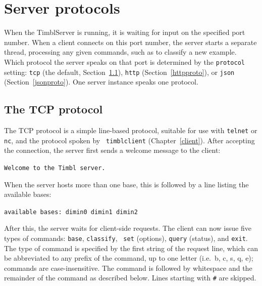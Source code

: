 \documentclass{report}
\begin{document}
\chapter{Server protocols}
\label{serverformat}

When the TimblServer is running, it is waiting for input on the
specified port number. When a client connects on this port number, the
server starts a separate thread, processing any given commands, such
as to classify a new example. Which protocol the server speaks on that
port is determined by the {\tt protocol} setting: {\tt tcp} (the
default, Section~\ref{tcpproto}), {\tt http}
(Section~\ref{httpproto}), or {\tt json} (Section~\ref{jsonproto}).
One server instance speaks one protocol.

\section{The TCP protocol}
\label{tcpproto}

The TCP protocol is a simple line-based protocol, suitable for use
with {\tt telnet} or {\tt nc}, and the protocol spoken by {\tt
  timblclient} (Chapter~\ref{client}). After accepting the connection,
the server first sends a welcome message to the client:

{\tt Welcome to the Timbl server.}

When the server hosts more than one base, this is followed by a line
listing the available bases:

{\tt available bases: dimin0 dimin1 dimin2 }

After this, the server waits for client-side requests.  The client can
now issue five types of commands: {\tt base}, {\tt classify}, {\tt
  set} (options), {\tt query} (status), and {\tt exit}. The type of
command is specified by the first string of the request line,
which can be abbreviated to any prefix of the command, up to one
letter (i.e.~b, c, s, q, e); commands are case-insensitive. The
command is followed by whitespace and the remainder of the command as
described below. Lines starting with {\tt \#} are skipped.
\end{document}
